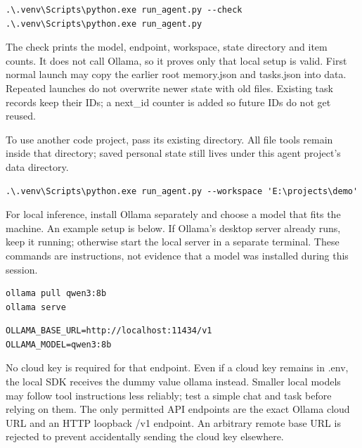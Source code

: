 \begin{Verbatim}[breaklines,breakanywhere,fontsize=\small]
.\.venv\Scripts\python.exe run_agent.py --check
.\.venv\Scripts\python.exe run_agent.py
\end{Verbatim}

The check prints the model, endpoint, workspace, state directory and item counts. It does not call Ollama, so it proves only that local setup is valid. First normal launch may copy the earlier root memory.json and tasks.json into data. Repeated launches do not overwrite newer state with old files. Existing task records keep their IDs; a next\_id counter is added so future IDs do not get reused.

To use another code project, pass its existing directory. All file tools remain inside that directory; saved personal state still lives under this agent project's data directory.

\begin{Verbatim}[breaklines,breakanywhere,fontsize=\small]
.\.venv\Scripts\python.exe run_agent.py --workspace 'E:\projects\demo'
\end{Verbatim}

For local inference, install Ollama separately and choose a model that fits the machine. An example setup is below. If Ollama's desktop server already runs, keep it running; otherwise start the local server in a separate terminal. These commands are instructions, not evidence that a model was installed during this session.

\begin{Verbatim}[breaklines,breakanywhere,fontsize=\small]
ollama pull qwen3:8b
ollama serve
\end{Verbatim}

\begin{Verbatim}[breaklines,breakanywhere,fontsize=\small]
OLLAMA_BASE_URL=http://localhost:11434/v1
OLLAMA_MODEL=qwen3:8b
\end{Verbatim}

No cloud key is required for that endpoint. Even if a cloud key remains in .env, the local SDK receives the dummy value ollama instead. Smaller local models may follow tool instructions less reliably; test a simple chat and task before relying on them. The only permitted API endpoints are the exact Ollama cloud URL and an HTTP loopback /v1 endpoint. An arbitrary remote base URL is rejected to prevent accidentally sending the cloud key elsewhere.

\cite{ollama-api,ollama-pricing}
